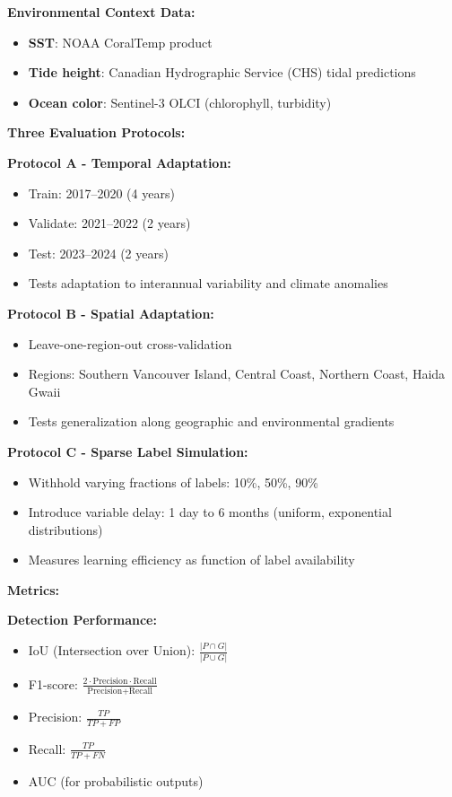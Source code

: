 \documentclass[11pt]{article}
\begin{document}
\textbf{Environmental Context Data:}
\begin{itemize}
    \item \textbf{SST}: NOAA CoralTemp product
    \item \textbf{Tide height}: Canadian Hydrographic Service (CHS) tidal predictions
    \item \textbf{Ocean color}: Sentinel-3 OLCI (chlorophyll, turbidity)
\end{itemize}

\textbf{Three Evaluation Protocols:}

\textbf{Protocol A - Temporal Adaptation:}
\begin{itemize}
    \item Train: 2017--2020 (4 years)
    \item Validate: 2021--2022 (2 years)
    \item Test: 2023--2024 (2 years)
    \item Tests adaptation to interannual variability and climate anomalies
\end{itemize}

\textbf{Protocol B - Spatial Adaptation:}
\begin{itemize}
    \item Leave-one-region-out cross-validation
    \item Regions: Southern Vancouver Island, Central Coast, Northern Coast, Haida Gwaii
    \item Tests generalization along geographic and environmental gradients
\end{itemize}

\textbf{Protocol C - Sparse Label Simulation:}
\begin{itemize}
    \item Withhold varying fractions of labels: 10\%, 50\%, 90\%
    \item Introduce variable delay: 1 day to 6 months (uniform, exponential distributions)
    \item Measures learning efficiency as function of label availability
\end{itemize}

\textbf{Metrics:}

\textbf{Detection Performance:}
\begin{itemize}
    \item IoU (Intersection over Union): $\frac{|P \cap G|}{|P \cup G|}$
    \item F1-score: $\frac{2 \cdot \text{Precision} \cdot \text{Recall}}{\text{Precision} + \text{Recall}}$
    \item Precision: $\frac{TP}{TP + FP}$
    \item Recall: $\frac{TP}{TP + FN}$
    \item AUC (for probabilistic outputs)
\end{itemize}
\end{document}

